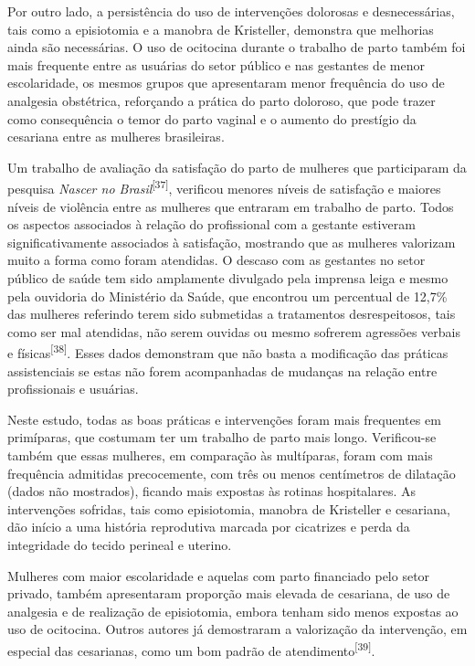 \documentclass{article}
\begin{document}
Por outro lado, a persistência do uso de intervenções dolorosas e
desnecessárias,
tais como a episiotomia e a manobra de Kristeller, demonstra que melhorias ainda
são
necessárias. O uso de ocitocina durante o trabalho de parto também foi mais
frequente entre as usuárias do setor público e nas gestantes de menor
escolaridade,
os mesmos grupos que apresentaram menor frequência do uso de analgesia
obstétrica,
reforçando a prática do parto doloroso, que pode trazer como consequência o
temor do
parto vaginal e o aumento do prestígio da cesariana entre as mulheres
brasileiras.

Um trabalho de avaliação da satisfação do parto de mulheres que participaram da
pesquisa \textit{Nascer no Brasil}\textsuperscript{[}\textsuperscript{37}\textsuperscript{]}, verificou menores níveis de
satisfação e maiores níveis de violência entre as mulheres que entraram em
trabalho
de parto. Todos os aspectos associados à relação do profissional com a gestante
estiveram significativamente associados à satisfação, mostrando que as mulheres
valorizam muito a forma como foram atendidas. O descaso com as gestantes no
setor
público de saúde tem sido amplamente divulgado pela imprensa leiga e mesmo pela
ouvidoria do Ministério da Saúde, que encontrou um percentual de 12,7\% das
mulheres
referindo terem sido submetidas a tratamentos desrespeitosos, tais como ser mal
atendidas, não serem ouvidas ou mesmo sofrerem agressões verbais e físicas\textsuperscript{[}\textsuperscript{38}\textsuperscript{]}. Esses dados demonstram que não
basta a modificação das práticas assistenciais se estas não forem acompanhadas
de
mudanças na relação entre profissionais e usuárias.

Neste estudo, todas as boas práticas e intervenções foram mais frequentes em
primíparas, que costumam ter um trabalho de parto mais longo. Verificou-se
também
que essas mulheres, em comparação às multíparas, foram com mais frequência
admitidas
precocemente, com três ou menos centímetros de dilatação (dados não mostrados),
ficando mais expostas às rotinas hospitalares. As intervenções sofridas, tais
como
episiotomia, manobra de Kristeller e cesariana, dão início a uma história
reprodutiva marcada por cicatrizes e perda da integridade do tecido perineal e
uterino.

Mulheres com maior escolaridade e aquelas com parto financiado pelo setor
privado,
também apresentaram proporção mais elevada de cesariana, de uso de analgesia e
de
realização de episiotomia, embora tenham sido menos expostas ao uso de
ocitocina.
Outros autores já demostraram a valorização da intervenção, em especial das
cesarianas, como um bom padrão de atendimento\textsuperscript{[}\textsuperscript{39}\textsuperscript{]}.
\end{document}

